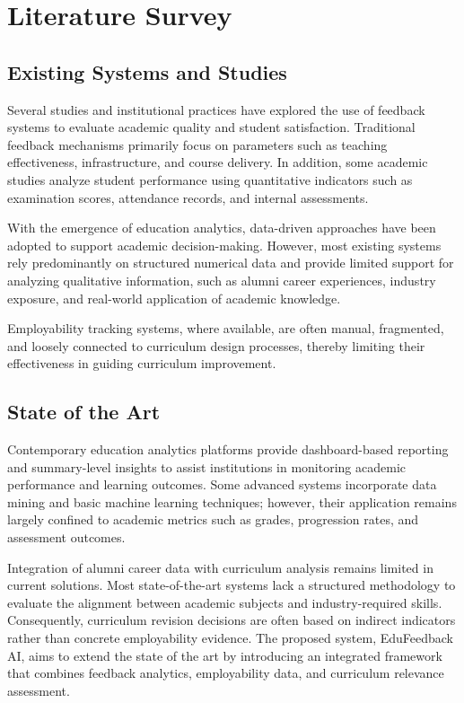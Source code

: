 \chapter{Literature Survey}
\label{Chapter:Literature}

\section{Existing Systems and Studies}
Several studies and institutional practices have explored the use of feedback systems to evaluate academic quality and student satisfaction. Traditional feedback mechanisms primarily focus on parameters such as teaching effectiveness, infrastructure, and course delivery. In addition, some academic studies analyze student performance using quantitative indicators such as examination scores, attendance records, and internal assessments.

With the emergence of education analytics, data-driven approaches have been adopted to support academic decision-making. However, most existing systems rely predominantly on structured numerical data and provide limited support for analyzing qualitative information, such as alumni career experiences, industry exposure, and real-world application of academic knowledge.

Employability tracking systems, where available, are often manual, fragmented, and loosely connected to curriculum design processes, thereby limiting their effectiveness in guiding curriculum improvement.

\section{State of the Art}
Contemporary education analytics platforms provide dashboard-based reporting and summary-level insights to assist institutions in monitoring academic performance and learning outcomes. Some advanced systems incorporate data mining and basic machine learning techniques; however, their application remains largely confined to academic metrics such as grades, progression rates, and assessment outcomes.

Integration of alumni career data with curriculum analysis remains limited in current solutions. Most state-of-the-art systems lack a structured methodology to evaluate the alignment between academic subjects and industry-required skills. Consequently, curriculum revision decisions are often based on indirect indicators rather than concrete employability evidence. The proposed system, EduFeedback AI, aims to extend the state of the art by introducing an integrated framework that combines feedback analytics, employability data, and curriculum relevance assessment.


